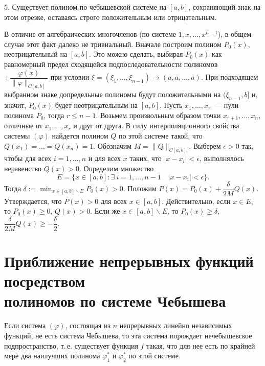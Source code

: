 5. Существует полином по чебышевской системе на $[a,b]$,
сохраняющий знак на этом отрезке, оставаясь строго положительным или отрицательным.

В отличие от алгебраических многочленов (по системе $1, x, \ldots, x^{n-1}$),
в общем случае этот факт далеко не тривиальный. Вначале построим
полином $P_0(x)$, неотрицательный на $[a,b]$.
 Это можно сделать, выбирая $P_0(x)$ как равномерный предел сходящейся
подпоследовательности полиномов $\pm\dfrac{\varphi(x)}{\|\varphi\|_{C[a,b]}}$ при условии
$\xi=(\xi_1,\ldots,\xi_{n-1})\to(a,a,\ldots,a)$.
При подходящем выбранном знаке допредельные полиномы будут положительными на
$(\xi_{n-1},b]$ и, значит, $P_0(x)$ будет неотрицательным на $[a,b]$.
Пусть $x_1,\ldots,x_r$~--- нули полинома $P_0$, тогда $r\le n-1$.
Возьмем
произвольным образом точки $x_{r+1},\ldots,x_{n}$, отличные от $x_1,\ldots,x_r$ и друг
от друга. В силу интерполяционного свойства системы $(\varphi)$ найдется полином $Q$ по
этой системе такой, что $Q(x_1)=\ldots=Q(x_{n})=1$. Обозначим $M=\|Q\|_{C[a,b]}$.
Выберем $\epsilon>0$ так, чтобы для всех $i=1,\ldots,n$ и для всех $x$ таких, что
$|x-x_i|<\epsilon$, выполнялось неравенство $Q(x)>0$. Определим множество
$$
E = \{x\in[a,b]\colon \exists\ i=1,\ldots,n-1\quad |x-x_i|<\epsilon\}.
$$
Тогда $\delta:=\min_{x\in [a,b]\backslash E}P_0(x) > 0$.
Положим $P(x) = P_0(x) + \dfrac\delta{2M} Q(x)$.
Утверждается, что $P(x)>0$ для всех $x\in[a,b]$. Действительно, если $x\in E$,
то $P_0(x)\ge 0$, $Q(x)>0$. Если же $x\in [a,b]\backslash E$, то $P_0(x)\ge\delta$,
$\dfrac\delta{2M}Q(x)\ge-\dfrac\delta2$.






\section{Приближение непрерывных функций посредством \\ полиномов по системе Чебышева}

\begin{teo}
Если система $(\varphi)$, состоящая из $n$ {непрерывных линейно}
{независимых} функций, не есть система Чебышева, то эта система порождает
нечебышевское подпространство, т.\,е. существует функция $f$ такая,
что для нее есть по крайней мере два наилучших полинома $\varphi_1^*$ и
$\varphi_2^*$ по этой системе.
\end{teo}

